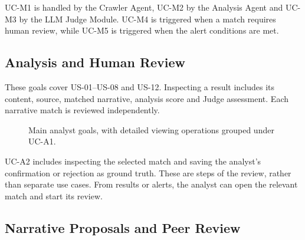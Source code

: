 \documentclass[12pt,a4paper]{article}
\newcommand{\umlactor}[4]{%
  \begin{scope}[shift={(#2,#3)},draw=ink,line width=.8pt]
    \draw (0,.45) circle (.18);
    \draw (0,.27)--(0,-.35);
    \draw (-.34,.03)--(.34,.03);
    \draw (0,-.35)--(-.30,-.82);
    \draw (0,-.35)--(.30,-.82);
    \coordinate (#1) at (.34,.03);
    \coordinate (#1-top) at (0,.66);
    \coordinate (#1-bottom) at (0,-.84);
    \node[below,text=ink,font=\small,align=center] at (0,-.9) {#4};
  \end{scope}
}
\begin{document}
UC-M1 is handled by the Crawler Agent, UC-M2 by the
Analysis Agent and UC-M3 by the LLM Judge Module.
UC-M4 is triggered when a match requires human review,
while UC-M5 is triggered when the alert conditions are met.


\clearpage
\subsection{Analysis and Human Review}

These goals cover US-01--US-08 and US-12. Inspecting a result includes its
content, source, matched narrative, analysis score and Judge assessment.
Each narrative match is reviewed independently.

\begin{figure}[H]
\centering
{}
\caption{Main analyst goals, with detailed viewing operations grouped under UC-A1.}
\label{fig:analyst-use-cases}
\end{figure}

UC-A2 includes inspecting the selected match and saving the analyst's
confirmation or rejection as ground truth. These are steps of the review,
rather than separate use cases. From results or alerts, the analyst can
open the relevant match and start its review.

\clearpage
\subsection{Narrative Proposals and Peer Review}
\end{document}
